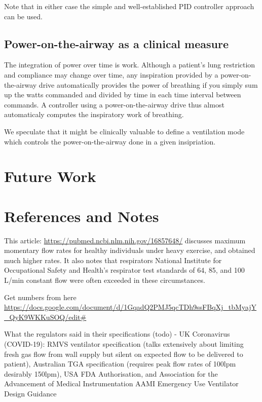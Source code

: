 \documentclass[conference]{article}
\begin{document}
Note that in either case the simple and well-established PID controller
approach can be used.

\subsection{Power-on-the-airway as a clinical measure}

The integration of power over time is work. Although a patient's
lung restriction and compliance may change over time, any inspiration
provided by a power-on-the-airway drive automatically provides
the power of breathing if you simply sum up the watts commanded
and divided by time in each time interval between commands.
A controller using a power-on-the-airway drive thus almost
automaticaly computes the inspiratory work of breathing.

We speculate that it might be clinically valuable to
define a ventilation mode which controls the power-on-the-airway
done in a given insipriation.

\section{Future Work}


\section{References and Notes}

This article: \url{https://pubmed.ncbi.nlm.nih.gov/16857648/}
discusses maximum momentary flow rates for healthy individuals under
heavy exercise, and obtained much higher rates. It also notes that
respirators National Institute for Occupational Safety and Health's respirator test standards of 64, 85, and 100 L/min constant flow
were often exceeded in these circumstances.

Get numbers from here
\url{https://docs.google.com/document/d/1GqadQ2PMJ5qcTDh9ssFBqXj_tbMyajY_QyK9WKKuSOQ/edit#}

What the regulators said in their specifications (todo) - UK Coronavirus (COVID-19): RMVS ventilator specification (talks extensively about limiting fresh gas flow from wall supply but silent on expected flow to be delivered to patient),  Australian TGA specification (requires peak flow rates of 100lpm desirably 150lpm), USA FDA Authorisation, and Association for the Advancement of Medical Instrumentation AAMI Emergency Use Ventilator Design Guidance




\printbibheading

\printbibliography
\end{document}
